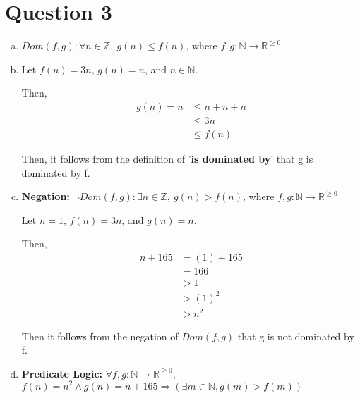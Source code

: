 \documentclass[12pt]{article}
\begin{document}
\section*{Question 3}
\begin{enumerate}[a.]
    \item

    $Dom(f,g): \forall n \in \mathbb{Z},\: g(n) \leq f(n)$, where $f,g: \mathbb{N}
    \to \mathbb{R}^{\geq 0}$

    \item

    Let $f(n) = 3n$, $g(n) = n$, and $n \in \mathbb{N}$.

    \bigskip

    Then,
    \setcounter{equation}{0}
    \begin{align}
        g(n) = n &\leq n + n + n\\
        &\leq 3n\\
        &\leq f(n)
    \end{align}

    Then, it follows from the definition of '\textbf{is dominated by}' that g is
    dominated by f.

    \item

    \textbf{Negation:} $\neg Dom(f,g): \exists n \in \mathbb{Z},\:g(n) > f(n)$, where
    $f,g: \mathbb{N} \to \mathbb{R}^{\geq 0}$

    \bigskip

    Let $n = 1$, $f(n) = 3n$, and $g(n) = n$.

    \bigskip

    Then,
    \setcounter{equation}{0}
    \begin{align}
        n + 165 &= (1) + 165\\
        &= 166\\
        &> 1\\
        &> (1)^2\\
        &> n^2
    \end{align}

    \bigskip

    Then it follows from the negation of $Dom(f,g)$ that g is not dominated by f.

    \item

    \textbf{Predicate Logic:} $\forall f,g:\mathbb{N} \to \mathbb{R}^{\geq 0}$,
    $f(n) = n^2 \land g(n) = n + 165 \Rightarrow (\exists m \in \mathbb{N},
    g(m) > f(m))$


\end{enumerate}
\end{document}
